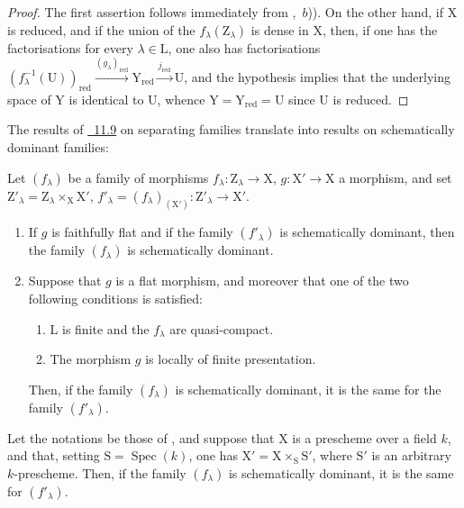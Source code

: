 \begin{proof}
The first assertion follows immediately from ,~$b$)).
On the other hand, if $\mathrm{X}$ is reduced, and if the union of the $f_\lambda(\mathrm{Z}_\lambda)$ is dense in $\mathrm{X}$, then, if one has the factorisations  for every $\lambda\in\mathrm{L}$, one also has factorisations $(f_\lambda^{-1}(\mathrm{U}))_\mathrm{red}\xrightarrow{(g_\lambda)_\mathrm{red}}\mathrm{Y}_\mathrm{red}\xrightarrow{j_\mathrm{red}}\mathrm{U}$, and the hypothesis implies that the underlying space of $\mathrm{Y}$ is identical to $\mathrm{U}$, whence $\mathrm{Y}=\mathrm{Y}_\mathrm{red}=\mathrm{U}$ since $\mathrm{U}$ is reduced.
\end{proof}

The results of {\hyperlink{ega4.c04.subsec.11-9}{\textsection~11.9}} on separating families translate into results on schematically dominant families:

\begin{theorem}[11.10.5]
\label{IV.11.10.5}
Let $(f_\lambda)$ be a family of morphisms $f_\lambda:\mathrm{Z}_\lambda\to\mathrm{X}$, $g:\mathrm{X}'\to\mathrm{X}$ a morphism, and set $\mathrm{Z}'_\lambda=\mathrm{Z}_\lambda\times_\mathrm{X}\mathrm{X}'$, $f'_\lambda=(f_\lambda)_{(\mathrm{X}')}:\mathrm{Z}'_\lambda\to\mathrm{X}'$.
\begin{enumerate}[label=(\roman*)]
  \item If $g$ is faithfully flat and if the family $(f'_\lambda)$ is schematically dominant, then the family $(f_\lambda)$ is schematically dominant.
  \item Suppose that $g$ is a flat morphism, and moreover that one of the two following conditions is satisfied:
  \begin{enumerate}[label=\emph{\alph*)}]
    \item $\mathrm{L}$ is finite and the $f_\lambda$ are quasi-compact.
    \item The morphism $g$ is locally of finite presentation.
  \end{enumerate}
  Then, if the family $(f_\lambda)$ is schematically dominant, it is the same for the family $(f'_\lambda)$.
\end{enumerate}
\end{theorem}

\begin{proposition}[11.10.6]
\label{IV.11.10.6}
Let the notations be those of , and suppose that $\mathrm{X}$ is a prescheme over a field $k$, and that, setting $\mathrm{S}=\operatorname{Spec}(k)$, one has $\mathrm{X}'=\mathrm{X}\times_\mathrm{S}\mathrm{S}'$, where $\mathrm{S}'$ is an arbitrary $k$-prescheme.
Then, if the family $(f_\lambda)$ is schematically dominant, it is the same for $(f'_\lambda)$.
\end{proposition}

